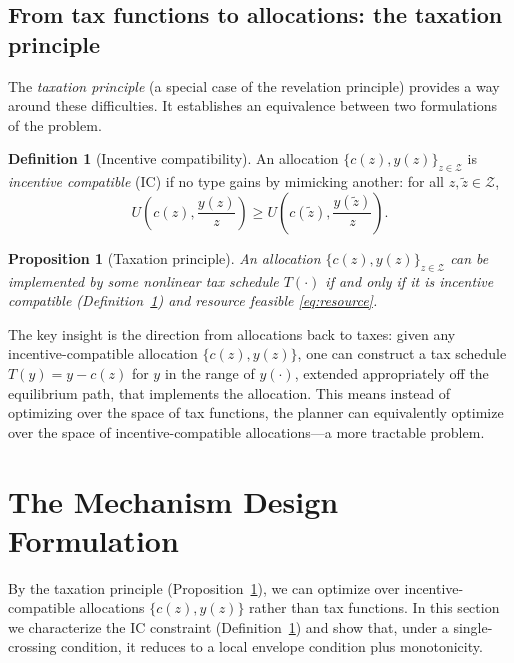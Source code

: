 \documentclass[12pt,a4paper]{article}
\theoremstyle{definition}
\newtheorem{definition}{Definition}[section]
\theoremstyle{plain}
\newtheorem{proposition}{Proposition}[section]
\theoremstyle{remark}
\newcommand{\calZ}{\mathcal{Z}}
\begin{document}
\subsection{From tax functions to allocations: the taxation principle}

The \emph{taxation principle} (a special case of the revelation principle) provides a way around these difficulties. It establishes an equivalence between two formulations of the problem.

\begin{definition}[Incentive compatibility]
\label{def:IC}
An allocation $\{c(z), y(z)\}_{z \in \calZ}$ is \emph{incentive compatible} (IC) if no type gains by mimicking another: for all $z, \tilde z \in \calZ$,
\[
  U\!\left(c(z), \frac{y(z)}{z}\right) \geq U\!\left(c(\tilde z), \frac{y(\tilde z)}{z}\right).
\]
\end{definition}

\begin{proposition}[Taxation principle]
\label{prop:taxation}
An allocation $\{c(z), y(z)\}_{z \in \calZ}$ can be implemented by some nonlinear tax schedule $T(\cdot)$ if and only if it is incentive compatible (Definition~\ref{def:IC}) and resource feasible \eqref{eq:resource}.
\end{proposition}

The key insight is the direction from allocations back to taxes: given any incentive-compatible allocation $\{c(z), y(z)\}$, one can construct a tax schedule $T(y) = y - c(z)$ for $y$ in the range of $y(\cdot)$, extended appropriately off the equilibrium path, that implements the allocation. This means instead of optimizing over the space of tax functions, the planner can equivalently optimize over the space of incentive-compatible allocations---a more tractable problem.

\section{The Mechanism Design Formulation}
\label{sec:mechanism}

By the taxation principle (Proposition~\ref{prop:taxation}), we can optimize over incentive-compatible allocations $\{c(z), y(z)\}$ rather than tax functions. In this section we characterize the IC constraint (Definition~\ref{def:IC}) and show that, under a single-crossing condition, it reduces to a local envelope condition plus monotonicity.
\end{document}
